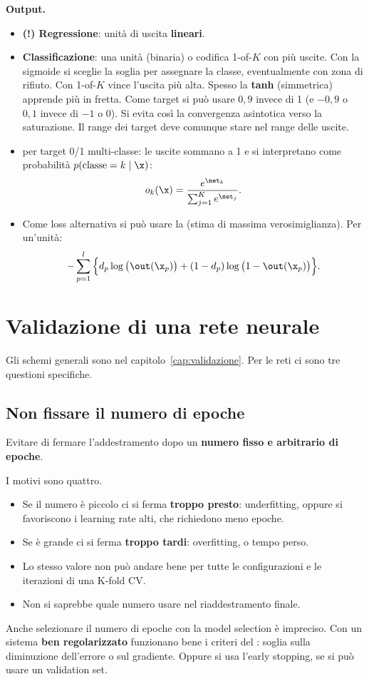 \textbf{Output.}
\begin{itemize}
  \item \textbf{(!) Regressione}: unità di uscita \textbf{lineari}.
  \item \textbf{Classificazione}: una unità (binaria) o codifica 1-of-$K$ con più uscite. Con la sigmoide si sceglie
        la soglia per assegnare la classe, eventualmente con zona di rifiuto. Con 1-of-$K$ vince l'uscita più
        alta. Spesso la \textbf{tanh} (simmetrica) apprende più in fretta. Come target si può usare $0{,}9$ invece
        di 1 (e $-0{,}9$ o $0{,}1$ invece di $-1$ o 0). Si evita così la convergenza asintotica verso la
        saturazione. Il range dei target deve comunque stare nel range delle uscite.
  \item {} per target 0/1 multi-classe: le uscite sommano a 1 e si interpretano come probabilità
        $p(\text{classe}=k\mid\x)$:
        \[
        o_k(\x) = \frac{e^{\net_k}}{\sum_{j=1}^{K}e^{\net_j}} .
        \]
  \item Come loss alternativa si può usare la  (stima di massima verosimiglianza). Per
        un'unità:
        \[
        -\sum_{p=1}^{l}\Big\{d_p\log\big(\out(\x_p)\big) + (1-d_p)\log\big(1-\out(\x_p)\big)\Big\}.
        \]
\end{itemize}

\section{Validazione di una rete neurale}
\label{sec:validazione-reti}

Gli schemi generali sono nel capitolo~\ref{cap:validazione}. Per le reti ci sono tre questioni specifiche.

\subsection{Non fissare il numero di epoche}
\begin{attenzione}
Evitare di fermare l'addestramento dopo un \textbf{numero fisso e arbitrario di epoche}.
\end{attenzione}
I motivi sono quattro.
\begin{itemize}
  \item Se il numero è piccolo ci si ferma \textbf{troppo presto}: underfitting, oppure si favoriscono i learning
        rate alti, che richiedono meno epoche.
  \item Se è grande ci si ferma \textbf{troppo tardi}: overfitting, o tempo perso.
  \item Lo stesso valore non può andare bene per tutte le configurazioni e le iterazioni di una K-fold CV.
  \item Non si saprebbe quale numero usare nel riaddestramento finale.
\end{itemize}
Anche selezionare il numero di epoche con la model selection è impreciso. Con un sistema \textbf{ben
regolarizzato} funzionano bene i criteri del : soglia sulla diminuzione dell'errore o sul
gradiente. Oppure si usa l'early stopping, se si può usare un validation set.

